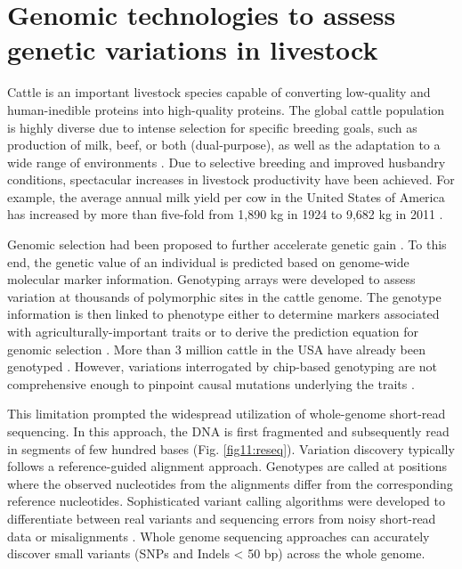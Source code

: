 \documentclass[../main.tex]{subfiles}
\begin{document}
\fi


\graphicspath{{figure/}{../figure/}}

\newpage
\onehalfspacing

\linespread{1.25}
\setlength{\parskip}{\baselineskip}

\normalsize

\section{Genomic technologies to assess genetic variations in livestock}

Cattle is an important livestock species capable of converting low-quality and human-inedible proteins into high-quality proteins. The global cattle population is highly diverse due to intense selection for specific breeding goals, such as production of milk, beef, or both (dual-purpose), as well as the adaptation to a wide range of environments \citep{zhang2020evolution}. Due to selective breeding and improved husbandry conditions, spectacular increases in livestock productivity have been achieved. For example, the average annual milk yield per cow in the United States of America has increased by more than five-fold from 1,890 kg in 1924 to 9,682 kg in 2011 \citep{georges2019harnessing}. 

Genomic selection had been proposed to further accelerate genetic gain \citep{meuwissen2001prediction}. To this end, the genetic value of an individual is predicted based on genome-wide molecular marker information. Genotyping arrays were developed to assess variation at thousands of polymorphic sites in the cattle genome. The genotype information is then linked to phenotype either to determine markers associated with agriculturally-important traits \citep{goddard2009mapping} or to derive the prediction equation for genomic selection \citep{meuwissen2001prediction}. More than 3 million cattle in the USA have already been genotyped \citep{wiggans2017genomic}. However, variations interrogated by chip-based genotyping  are  not comprehensive enough  to pinpoint causal mutations underlying the traits \citep{pausch2017evaluation}.

This limitation prompted the widespread utilization of whole-genome short-read sequencing. In this approach, the DNA is first fragmented and subsequently read in segments of few hundred bases (Fig. \ref{fig11:reseq}). Variation discovery typically follows a reference-guided alignment approach. Genotypes are called at positions where the observed nucleotides from the alignments differ from the corresponding reference nucleotides. Sophisticated variant calling algorithms were developed to differentiate between real variants and sequencing errors from noisy short-read data or misalignments \citep{depristo2011framework}. Whole genome sequencing approaches can accurately discover small variants (SNPs and Indels < 50 bp) across the whole genome. 
\end{document}
